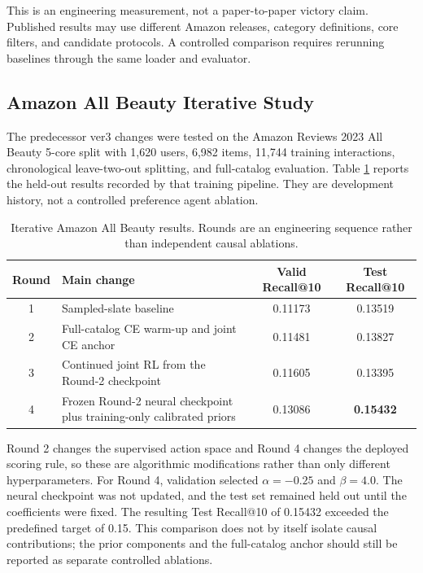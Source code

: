 \documentclass[11pt,a4paper]{article}
\begin{document}
This is an engineering measurement, not a paper-to-paper victory claim.
Published results may use different Amazon releases, category definitions,
core filters, and candidate protocols. A controlled comparison requires
rerunning baselines through the same loader and evaluator.

\subsection{Amazon All Beauty Iterative Study}

The predecessor ver3 changes were tested on the Amazon Reviews 2023 All Beauty
5-core split with 1,620 users, 6,982 items, 11,744 training interactions,
chronological leave-two-out splitting, and full-catalog evaluation. Table
\ref{tab:amazon-iterations} reports the held-out results recorded by that
training pipeline. They are development history, not a controlled preference
agent ablation.

\begin{table}[H]
\centering
\caption{Iterative Amazon All Beauty results. Rounds are an engineering
sequence rather than independent causal ablations.}
\label{tab:amazon-iterations}
\begin{tabularx}{\textwidth}{cXcc}
\toprule
Round & Main change & Valid Recall@10 & Test Recall@10\\
\midrule
1 & Sampled-slate baseline & 0.11173 & 0.13519\\
2 & Full-catalog CE warm-up and joint CE anchor & 0.11481 & 0.13827\\
3 & Continued joint RL from the Round-2 checkpoint & 0.11605 & 0.13395\\
4 & Frozen Round-2 neural checkpoint plus training-only calibrated priors &
0.13086 & \textbf{0.15432}\\
\bottomrule
\end{tabularx}
\end{table}

Round 2 changes the supervised action space and Round 4 changes the deployed
scoring rule, so these are algorithmic modifications rather than only different
hyperparameters. For Round 4, validation selected $\alpha=-0.25$ and
$\beta=4.0$. The neural checkpoint was not updated, and the test set remained
held out until the coefficients were fixed. The resulting Test Recall@10 of
0.15432 exceeded the predefined target of 0.15. This comparison does not by
itself isolate causal contributions; the prior components and the full-catalog
anchor should still be reported as separate controlled ablations.
\end{document}
